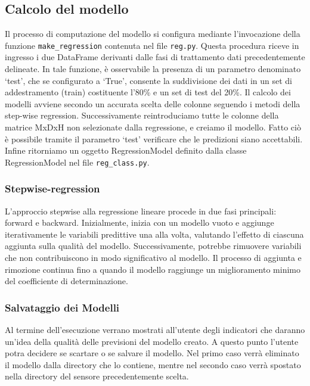 \documentclass[a4paper,10pt]{article}
\begin{document}
\subsection{Calcolo del modello}
Il processo di computazione del modello si configura mediante l'invocazione della funzione \texttt{make\_regression} contenuta nel file \texttt{reg.py}. 
Questa procedura riceve in ingresso i due DataFrame derivanti dalle fasi di trattamento dati precedentemente delineate. 
In tale funzione, è osservabile la presenza di un parametro denominato `test', che se configurato a `True', 
consente la suddivisione dei dati in un set di addestramento (train) costituente l'80\% e un set di test del 20\%.  Il calcolo dei modelli
avviene secondo un accurata scelta delle colonne seguendo i metodi della step-wise regression. 
Successivamente reintroduciamo tutte le colonne della matrice MxDxH non selezionate dalla regressione, e creiamo il modello. 
Fatto ciò è possibile tramite il parametro `test' verificare che le predizioni siano accettabili. Infine ritorniamo un oggetto RegressionModel definito 
dalla classe RegressionModel nel file \texttt{reg\_class.py}.

\subsubsection{Stepwise-regression}
L'approccio stepwise alla regressione lineare procede in due fasi principali: forward e backward. Inizialmente, inizia con un modello vuoto e 
aggiunge iterativamente le variabili predittive una alla volta, valutando l'effetto di ciascuna aggiunta sulla qualità del modello. 
Successivamente, potrebbe rimuovere variabili che non contribuiscono in modo significativo al modello.
Il processo di aggiunta e rimozione continua fino a quando il modello raggiunge un miglioramento minimo del coefficiente di determinazione.


\subsubsection{Salvataggio dei Modelli}
Al termine dell'esecuzione verrano mostrati all'utente degli indicatori che daranno un'idea della qualità delle previsioni del modello creato.
A questo punto l'utente potra decidere se scartare o se salvare il modello. Nel primo caso verrà eliminato il modello dalla directory che lo contiene, mentre nel 
secondo caso verrà spostato nella directory del sensore precedentemente scelta. 
\end{document}
